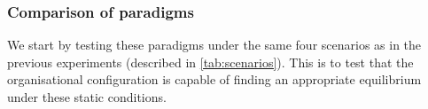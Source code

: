 

\subsubsection*{Comparison of paradigms}

We start by testing these paradigms under the same four scenarios as in the
previous experiments (described in \autoref{tab:scenarios}). This is to test
that the organisational configuration is capable of finding an appropriate
equilibrium under these static conditions.




